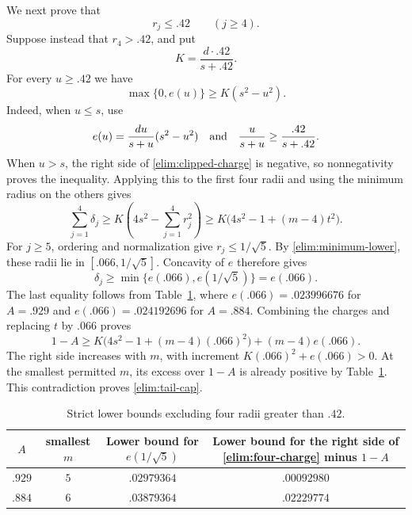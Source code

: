 We next prove that
\begin{equation}\label{elim:tail-cap}
 r_j\le.42\qquad(j\ge4).
\end{equation}
Suppose instead that $r_4>.42$, and put
\[
 K=\frac{d\cdot.42}{s+.42}.
\]
For every $u\ge.42$ we have
\begin{equation}\label{elim:clipped-charge}
 \max\{0,e(u)\}\ge K(s^2-u^2).
\end{equation}
Indeed, when $u\le s$, use
\[
 e(u)=\frac{du}{s+u}(s^2-u^2)
 \quad\hbox{and}\quad \frac{u}{s+u}\ge\frac{.42}{s+.42}.
\]
When $u>s$, the right side of \eqref{elim:clipped-charge} is negative,
so nonnegativity proves the inequality. Applying this to the first four
radii and using the minimum radius on the others gives
\[
 \sum_{j=1}^4\delta_j
 \ge K\left(4s^2-\sum_{j=1}^4r_j^2\right)
 \ge K\bigl(4s^2-1+(m-4)t^2\bigr).
\]
For $j\ge5$, ordering and normalization give
$r_j\le1/\sqrt5$. By \eqref{elim:minimum-lower}, these radii lie
in $[.066,1/\sqrt5]$. Concavity of $e$ therefore gives
\[
 \delta_j\ge\min\{e(.066),e(1/\sqrt5)\}=e(.066).
\]
The last equality follows from Table~\ref{elim:four-table}, where
$e(.066)=.023996676$ for $A=.929$ and
$e(.066)=.024192696$ for $A=.884$.
Combining the charges and replacing $t$ by $.066$ proves
\begin{equation}\label{elim:four-charge}
 1-A\ge K\bigl(4s^2-1+(m-4)(.066)^2\bigr)+(m-4)e(.066).
\end{equation}
The right side increases with $m$, with increment
$K(.066)^2+e(.066)>0$. At the smallest permitted $m$, its excess
over $1-A$ is already positive by Table~\ref{elim:four-table}.
This contradiction proves \eqref{elim:tail-cap}.

\begin{table}[ht]
\centering
\begin{tabular}{c|c|c|c}
$A$ & smallest $m$ & \shortstack{Lower bound for\\ $e(1/\sqrt5)$} &
 \shortstack{Lower bound for the right side of\\ \eqref{elim:four-charge} minus $1-A$}\\
\hline
$.929$ & $5$ & $.02979364$ & $.00092980$\\
$.884$ & $6$ & $.03879364$ & $.02229774$
\end{tabular}
\caption{Strict lower bounds excluding four radii greater than $.42$.}
\label{elim:four-table}
\end{table}

